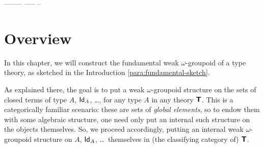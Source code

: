 % 
% 
% 









--------%
-----%
--%







\section{Overview}

In this chapter, we will construct the fundamental weak $\omega$-groupoid of a type theory, as sketched in the Introduction \ref{para:fundamental-sketch}.

As explained there, the goal is to put a weak $\omega$-groupoid structure on the sets of closed terms of type $A$, $\mathsf{Id}_A$, \ldots, for any type $A$ in any theory $\textbf{\textsf{T}}$.  This is a categorically familiar scenario: these are sets of \emph{global elements}, so to endow them with some algebraic structure, one need only put an internal such structure on the objects themselves.  So, we proceed accordingly, putting an internal weak $\omega$-groupoid structure on $A$, $\mathsf{Id}_A$, \ldots\ themselves in (the classifying category of) $\textbf{\textsf{T}}$.

